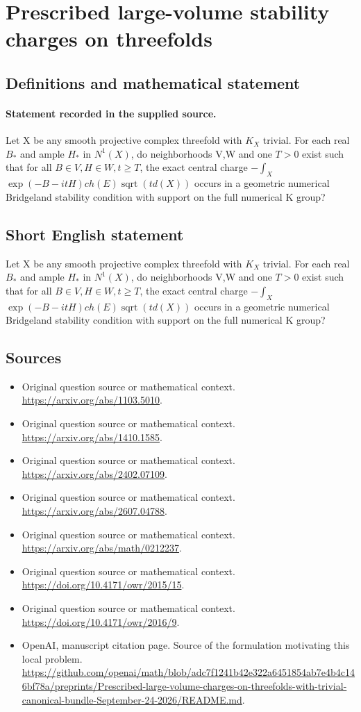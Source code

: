 \documentclass[11pt]{article}
\begin{document}
\section*{Prescribed large-volume stability charges on threefolds}\label{statement}
\subsection{Definitions and mathematical statement}
\paragraph{Statement recorded in the supplied source.}
Let X be any smooth projective complex threefold with $K_X$ trivial. For each real $B_*$ and ample $H_*$ in $N^{1}(X)$, do neighborhoods V,W and one $T>0$ exist such that for all $B\in V,H\in W,t\geq T$, the exact central charge $-\int _X$ $\exp (-B-itH)ch(E)\operatorname{sqrt}(td(X))$ occurs in a geometric numerical Bridgeland stability condition with support on the full numerical K group?
\subsection{Short English statement}
Let X be any smooth projective complex threefold with $K_X$ trivial. For each real $B_*$ and ample $H_*$ in $N^{1}(X)$, do neighborhoods V,W and one $T>0$ exist such that for all $B\in V,H\in W,t\geq T$, the exact central charge $-\int _X$ $\exp (-B-itH)ch(E)\operatorname{sqrt}(td(X))$ occurs in a geometric numerical Bridgeland stability condition with support on the full numerical K group?
\subsection{Sources}
\begin{itemize}
\item[S1] Original question source or mathematical context.
\url{https://arxiv.org/abs/1103.5010}.
\item[S2] Original question source or mathematical context.
\url{https://arxiv.org/abs/1410.1585}.
\item[S3] Original question source or mathematical context.
\url{https://arxiv.org/abs/2402.07109}.
\item[S4] Original question source or mathematical context.
\url{https://arxiv.org/abs/2607.04788}.
\item[S5] Original question source or mathematical context.
\url{https://arxiv.org/abs/math/0212237}.
\item[S6] Original question source or mathematical context.
\url{https://doi.org/10.4171/owr/2015/15}.
\item[S7] Original question source or mathematical context.
\url{https://doi.org/10.4171/owr/2016/9}.
\item[S8] OpenAI, manuscript citation page. Source of the formulation motivating this local problem.
\url{https://github.com/openai/math/blob/adc7f1241b42e322a6451854ab7e4b4c146bf78a/preprints/Prescribed-large-volume-charges-on-threefolds-with-trivial-canonical-bundle-September-24-2026/README.md}.
\end{itemize}
\end{document}
